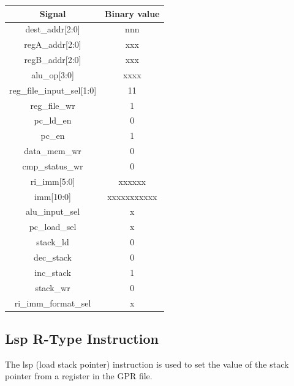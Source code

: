 \documentclass{article}
\begin{document}
\begin{par}
	\begin{center}
		\begin{tabular}{|c|c|}
			\hline 
			\textbf{Signal} & \textbf{Binary value} \\ 
			\hline 
			dest\_addr[2:0] & nnn \\ 
			\hline 
			regA\_addr[2:0] & xxx \\ 
			\hline 
			regB\_addr[2:0] & xxx \\ 
			\hline 
			alu\_op[3:0] & xxxx \\ 
			\hline 
			reg\_file\_input\_sel[1:0] & 11 \\ 
			\hline 
			reg\_file\_wr & 1 \\ 
			\hline 
			pc\_ld\_en & 0 \\ 
			\hline 
			pc\_en & 1 \\ 
			\hline 
			data\_mem\_wr & 0 \\ 
			\hline 
			cmp\_status\_wr & 0 \\ 
			\hline 
			ri\_imm[5:0] & xxxxxx \\ 
			\hline 
			imm[10:0] & xxxxxxxxxxx \\ 
			\hline 
			alu\_input\_sel & x \\ 
			\hline 
			pc\_load\_sel & x \\ 
			\hline 
			stack\_ld & 0 \\ 
			\hline 
			dec\_stack & 0 \\ 
			\hline 
			inc\_stack & 1 \\ 
			\hline 
			stack\_wr & 0 \\ 
			\hline 
			ri\_imm\_format\_sel & x \\ 
			\hline 
		\end{tabular} 
	\end{center}

	\newpage
	\subsection{Lsp R-Type Instruction}
	
	The lsp (load stack pointer) instruction is used to set the value of the stack pointer from a register in the GPR file. 
	

\end{par}
\end{document}
